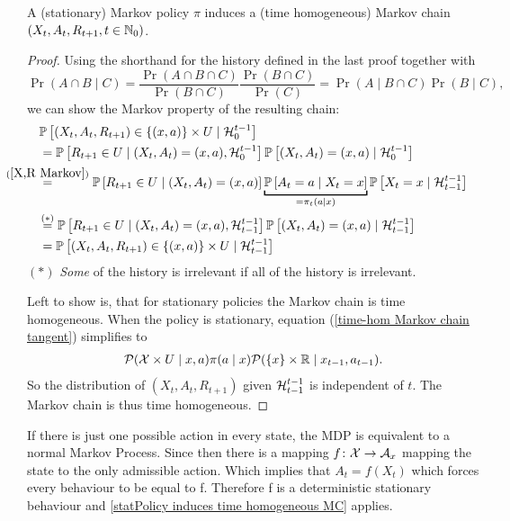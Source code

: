 \begin{prop}\label{statPolicy induces time homogeneous MC}
	A (stationary) Markov  policy \(\pi\) induces a (time homogeneous) Markov chain \((X_t,A_t,R_{t+1},t\in\mathbb{N}_0)\).
\end{prop}
\begin{proof} 

	Using the shorthand for the history defined in the last proof together with 
	\[
		\Pr(A\cap B \mid C)
		=\frac{\Pr(A\cap B\cap C)}{\Pr(B\cap C)}\frac{\Pr(B\cap C)}{\Pr(C)} 
		= \Pr(A\mid B\cap C)\Pr(B\mid C),
	\]
	we can show the Markov property of the resulting chain:
	\begin{align}
		&\Pr\left[(X_t,A_t,R_{t+1})\in\{(x,a)\}\times U \mid \cH_0^{t-1} \right] \nonumber \\
		&=\Pr\left[R_{t+1}\in U \mid (X_t, A_t)=(x,a), \cH_0^{t-1}\right]
		\Pr\left[(X_t, A_t)=(x,a)\mid\cH_0^{t-1}\right]
		\nonumber\\
		&\lxeq{(\ref{X,R Markov})}\Pr\left[R_{t+1}\in U \mid (X_t, A_t)=(x,a)\right]
		\underbracket[1pt]{\Pr\left[A_t=a \mid X_t=x\right]}_{=\pi_t(a\mid x)}
		\Pr\left[X_t=x\mid \cH_{t-1}^{t-1}\right]
		\label{time-hom Markov chain tangent}\\
		&\lxeq{(*)}\Pr\left[R_{t+1}\in U \mid (X_t, A_t)=(x,a), \cH_{t-1}^{t-1}\right]
		\Pr\left[(X_t, A_t)=(x,a)\mid\cH_{t-1}^{t-1}\right]
		\nonumber\\
		&=\Pr\left[(X_t,A_t,R_{t+1})\in\{(x,a)\}\times U \mid \cH_{t-1}^{t-1} \right]
		\nonumber
	\end{align}
	\((*)\) \emph{Some} of the history is irrelevant if all of the history is irrelevant. 
	
	Left to show is, that for stationary policies the Markov chain is time homogeneous. When the policy is stationary, equation (\ref{time-hom Markov chain tangent}) simplifies to
	\begin{align*}
		\mathcal{P}(\mathcal{X}\times U \mid x,a)\pi(a\mid x)
		\mathcal{P}(\{x\}\times \mathbb{R} \mid x_{t-1}, a_{t-1}).
	\end{align*}
	So the distribution of \((X_{t},A_{t},R_{t+1})\) given \(\mathcal{H}^{t-1}_{t-1}\) is independent of \(t\). The Markov chain is thus time homogeneous.
\end{proof} 
\begin{remark} 
If there is just one possible action in every state, the MDP is equivalent to a normal Markov Process. 
Since then there is a mapping \(f\colon\mathcal{X}\to\mathcal{A}_x\) mapping the state to  the only admissible action. Which implies that \(A_t=f(X_t)\) which forces every behaviour to be equal to f. Therefore f is a deterministic stationary behaviour and \ref{statPolicy induces time homogeneous MC} applies.  
\end{remark}

